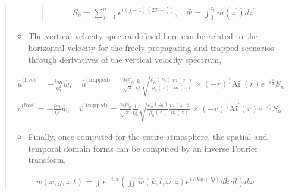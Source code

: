 \documentclass[letterpaper,10pt,english]{sphinxmanual}
\begin{document}
\begin{itemize}
\begin{quote}
\begin{itemize}
\begin{quote}
\begin{itemize}
\end{itemize}
\begin{equation*}
\begin{split}S_n = \sum_{j = 1}^n{e^{i \left( j -1 \right) \left(2 \Phi - \frac{\pi}{2} \right)}}, \quad \Phi = \int_0^{z_t} m \left( z^\prime \right) d z^\prime\end{split}
\end{equation*}\end{quote}

\item {} 
The vertical velocity spectra defined here can be related to the horizontal velocity for the freely propagating and trapped scenarios through derivatives of the vertical velocity spectrum,

\end{itemize}
\begin{equation*}
\begin{split}\hat{u}^\text{(free)} = - \frac{k m}{k_h^2} \hat{w}, \quad
\hat{u}^\text{(trapped)} = \frac{2 i \hat{w}_0 }{\sqrt{\pi}}\frac{k}{k_h^2} \sqrt{ \frac{\rho_0 \left( z_0 \right)}{\rho_0 \left( z \right)} \frac{m \left( z_0 \right)}{m \left( z \right)}} \times \left( - r \right)^\frac{1}{4} \text{Ai}^\prime \left( r \right) e^{-i \frac{\pi}{4}} S_n\end{split}
\end{equation*}\begin{equation*}
\begin{split}\hat{v}^\text{(free)} = - \frac{l m}{k_h^2} \hat{w}, \quad
\hat{v}^\text{(trapped)} = \frac{2 i \hat{w}_0 }{\sqrt{\pi}}\frac{l}{k_h^2} \sqrt{ \frac{\rho_0 \left( z_0 \right)}{\rho_0 \left( z \right)} \frac{m \left( z_0 \right)}{m \left( z \right)}} \times \left( - r \right)^\frac{1}{4} \text{Ai}^\prime \left( r \right) e^{-i \frac{\pi}{4}} S_n\end{split}
\end{equation*}\begin{itemize}
\item {} 
Finally, once computed for the entire atmosphere, the spatial and temporal domain forms can be computed by an inverse Fourier transform,

\end{itemize}
\begin{equation*}
\begin{split}w \left( x, y, z, t \right) = \int{e^{-i \omega t} \left( \iint{ \hat{w} \left( k, l, \omega, z \right) e^{i \left( kx + ly \right)} dk \, dl} \right) d \omega}\end{split}
\end{equation*}


\end{quote}
\end{itemize}
\end{document}
